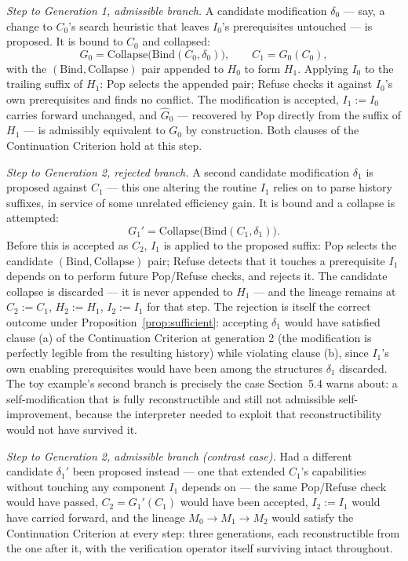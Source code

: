 \documentclass[11pt]{book}
\begin{document}
\emph{Step to Generation 1, admissible branch.} A candidate modification $\delta_0$ --- say, a change to $C_0$'s search heuristic that leaves $I_0$'s prerequisites untouched --- is proposed. It is bound to $C_0$ and collapsed:
\[
G_0 = \mathrm{Collapse}\big(\mathrm{Bind}(C_0,\delta_0)\big), \qquad C_1 = G_0(C_0),
\]
with the $(\mathrm{Bind}, \mathrm{Collapse})$ pair appended to $H_0$ to form $H_1$. Applying $I_0$ to the trailing suffix of $H_1$: Pop selects the appended pair; Refuse checks it against $I_0$'s own prerequisites and finds no conflict. The modification is accepted, $I_1 := I_0$ carries forward unchanged, and $\widehat{G}_0$ --- recovered by Pop directly from the suffix of $H_1$ --- is admissibly equivalent to $G_0$ by construction. Both clauses of the Continuation Criterion hold at this step.

\emph{Step to Generation 2, rejected branch.} A second candidate modification $\delta_1$ is proposed against $C_1$ --- this one altering the routine $I_1$ relies on to parse history suffixes, in service of some unrelated efficiency gain. It is bound and a collapse is attempted:
\[
G_1' = \mathrm{Collapse}\big(\mathrm{Bind}(C_1,\delta_1)\big).
\]
Before this is accepted as $C_2$, $I_1$ is applied to the proposed suffix: Pop selects the candidate $(\mathrm{Bind},\mathrm{Collapse})$ pair; Refuse detects that it touches a prerequisite $I_1$ depends on to perform future Pop/Refuse checks, and rejects it. The candidate collapse is discarded --- it is never appended to $H_1$ --- and the lineage remains at $C_2 := C_1$, $H_2 := H_1$, $I_2 := I_1$ for that step. The rejection is itself the correct outcome under Proposition~\ref{prop:sufficient}: accepting $\delta_1$ would have satisfied clause (a) of the Continuation Criterion at generation 2 (the modification is perfectly legible from the resulting history) while violating clause (b), since $I_1$'s own enabling prerequisites would have been among the structures $\delta_1$ discarded. The toy example's second branch is precisely the case Section~5.4 warns about: a self-modification that is fully reconstructible and still not admissible self-improvement, because the interpreter needed to exploit that reconstructibility would not have survived it.

\emph{Step to Generation 2, admissible branch (contrast case).} Had a different candidate $\delta_1'$ been proposed instead --- one that extended $C_1$'s capabilities without touching any component $I_1$ depends on --- the same Pop/Refuse check would have passed, $C_2 = G_1'(C_1)$ would have been accepted, $I_2 := I_1$ would have carried forward, and the lineage $M_0 \to M_1 \to M_2$ would satisfy the Continuation Criterion at every step: three generations, each reconstructible from the one after it, with the verification operator itself surviving intact throughout.
\end{document}
